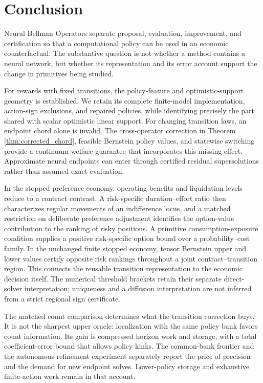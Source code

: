 \section{Conclusion}
Neural Bellman Operators separate proposal, evaluation, improvement, and certification so that a computational policy can be used in an economic counterfactual. The substantive question is not whether a method contains a neural network, but whether its representation and its error account support the change in primitives being studied.

For rewards with fixed transitions, the policy-feature and optimistic-support geometry is established. We retain its complete finite-model implementation, action-sign exclusions, and repaired policies, while identifying precisely the part shared with scalar optimistic linear support. For changing transition laws, an endpoint chord alone is invalid. The cross-operator correction in Theorem \ref{thm:corrected_chord}, feasible Bernstein policy values, and statewise switching provide a continuum welfare guarantee that incorporates this missing effect. Approximate neural endpoints can enter through certified residual supersolutions rather than assumed exact evaluation.

In the stopped preference economy, operating benefits and liquidation levels reduce to a contract contrast. A risk-specific duration--effort ratio then characterizes regular movements of an indifference locus, and a matched restriction on deliberate preference adjustment identifies the option-value contribution to the ranking of risky positions. A primitive consumption-exposure condition supplies a positive risk-specific option bound over a probability--cost family. In the unchanged finite stopped economy, tensor Bernstein upper and lower values certify opposite risk rankings throughout a joint contract--transition region. This connects the reusable transition representation to the economic decision itself. The numerical threshold brackets retain their separate direct-solver interpretation; uniqueness and a diffusion interpretation are not inferred from a strict regional sign certificate.

The matched count comparison determines what the transition correction buys. It is not the sharpest upper oracle: localization with the same policy bank favors count information. Its gain is compressed horizon work and storage, with a total coefficient-error bound that allows policy kinks. The common-bank frontier and the autonomous refinement experiment separately report the price of precision and the demand for new endpoint solves. Lower-policy storage and exhaustive finite-action work remain in that account.

